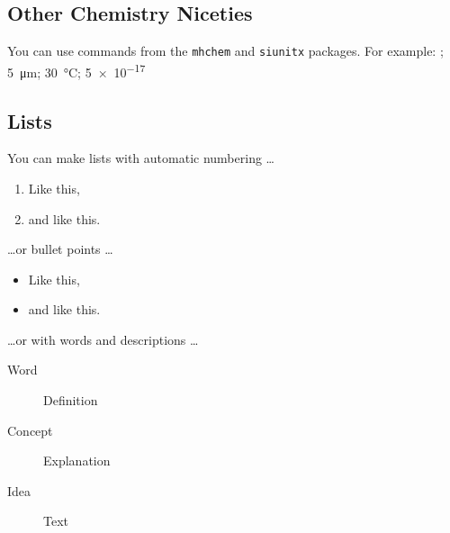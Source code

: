 \documentclass[9pt,lineno]{elife}
\begin{document}
\begin{figure}
\label{videosupp:sv1}
\label{figdata:first}
\label{figdata:second}
\end{figure}

\subsection{Other Chemistry Niceties}

You can use commands from the \texttt{mhchem} and \texttt{siunitx} packages. For example: ; \SI{5}{\micro\metre}; \SI{30}{\degreeCelsius}; \SI{5e-17}{\Molar}

\subsection{Lists}

You can make lists with automatic numbering \dots

\begin{enumerate}
\item Like this,
\item and like this.
\end{enumerate}
\dots or bullet points \dots
\begin{itemize} 
\item Like this,
\item and like this.
\end{itemize}
\dots or with words and descriptions \dots
\begin{description}
\item[Word] Definition
\item[Concept] Explanation
\item[Idea] Text
\end{description}
\end{document}
